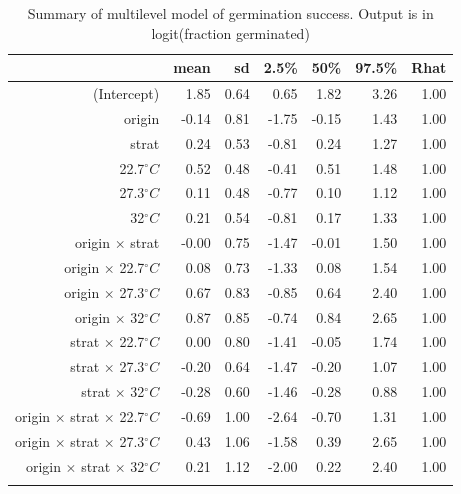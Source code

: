 \documentclass[12pt]{article}\usepackage[]{graphicx}\usepackage[]{color}
\begin{document}
\begin{longtable}{rrrrrrr}
\caption{Summary of multilevel model of germination success. Output is in logit(fraction germinated)} \\ 
  & mean & sd & 2.5\% & 50\% & 97.5\% & Rhat \\ 
  \hline
(Intercept) & 1.85 & 0.64 & 0.65 & 1.82 & 3.26 & 1.00 \\ 
  origin & -0.14 & 0.81 & -1.75 & -0.15 & 1.43 & 1.00 \\ 
  strat & 0.24 & 0.53 & -0.81 & 0.24 & 1.27 & 1.00 \\ 
  22.7$^\circ C$ & 0.52 & 0.48 & -0.41 & 0.51 & 1.48 & 1.00 \\ 
  27.3$^\circ C$ & 0.11 & 0.48 & -0.77 & 0.10 & 1.12 & 1.00 \\ 
  32$^\circ C$ & 0.21 & 0.54 & -0.81 & 0.17 & 1.33 & 1.00 \\ 
  origin $\times$ strat & -0.00 & 0.75 & -1.47 & -0.01 & 1.50 & 1.00 \\ 
  origin $\times$ 22.7$^\circ C$ & 0.08 & 0.73 & -1.33 & 0.08 & 1.54 & 1.00 \\ 
  origin $\times$ 27.3$^\circ C$ & 0.67 & 0.83 & -0.85 & 0.64 & 2.40 & 1.00 \\ 
  origin $\times$ 32$^\circ C$ & 0.87 & 0.85 & -0.74 & 0.84 & 2.65 & 1.00 \\ 
  strat $\times$ 22.7$^\circ C$ & 0.00 & 0.80 & -1.41 & -0.05 & 1.74 & 1.00 \\ 
  strat $\times$ 27.3$^\circ C$ & -0.20 & 0.64 & -1.47 & -0.20 & 1.07 & 1.00 \\ 
  strat $\times$ 32$^\circ C$ & -0.28 & 0.60 & -1.46 & -0.28 & 0.88 & 1.00 \\ 
  origin $\times$ strat $\times$ 22.7$^\circ C$ & -0.69 & 1.00 & -2.64 & -0.70 & 1.31 & 1.00 \\ 
  origin $\times$ strat $\times$ 27.3$^\circ C$ & 0.43 & 1.06 & -1.58 & 0.39 & 2.65 & 1.00 \\ 
  origin $\times$ strat $\times$ 32$^\circ C$ & 0.21 & 1.12 & -2.00 & 0.22 & 2.40 & 1.00 \\ 
  \hline
\label{tab:mod_rate}
\end{longtable}
\end{document}
